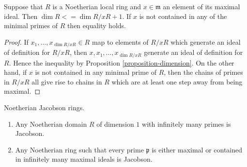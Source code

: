 \begin{lemma}
\label{lemma-one-equation}
Suppose that $R$ is a Noetherian local ring and $x\in \mathfrak m$ an
element of its maximal ideal. Then $\dim R <= \dim R/xR + 1$.
If $x$ is not contained in any of the minimal primes of $R$
then equality holds.
\end{lemma}

\begin{proof}
If $x_1,\ldots,x_{\dim R/xR} \in R$ map to elements of $R/xR$ which
generate an ideal of definition for $R/xR$, then $x, x_1, \ldots,
x_{\dim R/xR}$ generate an ideal of definition for $R$. Hence
the inequality by Proposition \ref{proposition-dimension}.
On the other hand, if $x$ is not contained in any minimal
prime of $R$, then the chains of primes in $R/xR$ all give
rise to chains in $R$ which are at least one step away
from being maximal.
\end{proof}

\begin{lemma}
\label{lemma-noetherian-dim-1-Jacobson}
Noetherian Jacobson rings.
\begin{enumerate}
\item Any Noetherian domain $R$ of dimension $1$
with infinitely many primes is Jacobson.
\item Any Noetherian ring such that every prime
$\mathfrak p$ is either maximal or contained in
infinitely many maximal ideals is Jacobson.
\end{enumerate}
\end{lemma}

